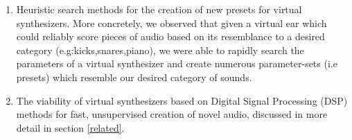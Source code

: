 \documentclass{nime-alternate} %
\begin{document}
\begin{enumerate}[label=\roman*]
\item Heuristic search methods for the creation of new presets for virtual synthesizers. More concretely, we observed that given a virtual ear which could reliably score pieces of audio based on its resemblance to a desired category (e.g:kicks,snares,piano), we were able to rapidly search the parameters of a virtual synthesizer and create numerous parameter-sets (i.e presets) which resemble our desired category of sounds.
\item The viability of virtual synthesizers based on Digital Signal Processing (DSP) methods for fast, unsupervised creation of novel audio, discussed in more detail in section \ref{related}. \\
\end{enumerate}
\end{document}
